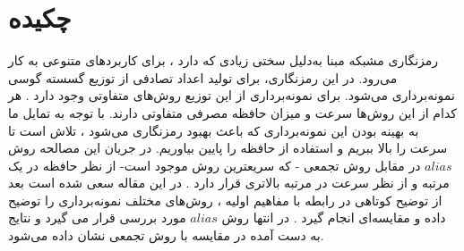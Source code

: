 \chapter*{چکیده}
رمزنگاری مشبکه مبنا به‌دلیل سختی زیادی که دارد ، برای کاربردهای متنوعی به کار می‌رود. در این رمزنگاری، برای تولید اعداد تصادفی از توزیع گسسته گوسی نمونه‌برداری می‌شود. برای نمونه‌برداری از این توزیع روش‌های متفاوتی وجود دارد . هر کدام از این روش‌ها سرعت و میزان حافظه مصرفی متفاوتی دارند. با توجه به تمایل ما به بهینه بودن این نمونه‌برداری که باعث بهبود رمزنگاری می‌شود ، تلاش است تا سرعت را بالا ببریم و استفاده از حافظه را پایین بیاوریم. در جریان این مصالحه روش $alias$ در مقابل روش تجمعی - که سریعترین روش موجود است- از نظر حافظه در یک مرتبه و از نظر سرعت در مرتبه بالاتری قرار دارد . در این مقاله سعی شده است بعد از توضیح کوتاهی در رابطه با مفاهیم اولیه ، روش‌های مختلف نمونه‌برداری را توضیح داده و مقایسه‌ای انجام گیرد . در انتها روش $alias$ مورد بررسی قرار می گیرد و نتایج به دست آمده در مقایسه با روش تجمعی نشان داده می‌شود. 